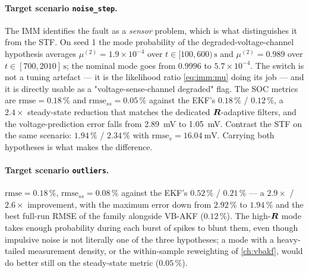 \paragraph{Target scenario \texttt{noise\_step}.}  The IMM identifies the fault as a \emph{sensor}
problem, which is what distinguishes it from the STF.  On seed 1 the mode probability of the
degraded-voltage-channel hypothesis averages $\mu^{(2)}=1.9\times10^{-4}$ over
$t\in[100,600)\,\si{\second}$ and $\mu^{(2)}=0.989$ over $t\in[700,2010]\,\si{\second}$; the nominal
mode goes from $0.9996$ to $5.7\times10^{-4}$.  The switch is not a tuning artefact --- it is the
likelihood ratio \eqref{eq:imm:mu} doing its job --- and it is directly usable as a
"voltage-sense-channel degraded" flag.  The SOC metrics are $\mathrm{rmse}=0.18\,\%$ and
$\mathrm{rmse}_{ss}=\mathbf{0.05\,\%}$ against the EKF's $0.18\,\%$ / $0.12\,\%$, a $2.4\times$
steady-state reduction that matches the dedicated $\bm{R}$-adaptive filters, and the voltage-prediction
error falls from \SI{2.89}{\milli\volt} to \SI{1.05}{\milli\volt}.  Contrast the STF on the same
scenario: $1.94\,\%$ / $2.34\,\%$ with $\mathrm{rmse}_v=\SI{16.04}{\milli\volt}$.  Carrying both
hypotheses is what makes the difference.

\paragraph{Target scenario \texttt{outliers}.}  $\mathrm{rmse}=0.18\,\%$,
$\mathrm{rmse}_{ss}=0.08\,\%$ against the EKF's $0.52\,\%$ / $0.21\,\%$ --- a $2.9\times$ /
$2.6\times$ improvement, with the maximum error down from $2.92\,\%$ to $1.94\,\%$ and the best
full-run RMSE of the family alongside VB-AKF ($0.12\,\%$).  The high-$\bm{R}$ mode takes enough
probability during each burst of spikes to blunt them, even though impulsive noise is not literally
one of the three hypotheses; a mode with a heavy-tailed measurement density, or the within-sample
reweighting of \cref{ch:vbakf}, would do better still on the steady-state metric ($0.05\,\%$).

